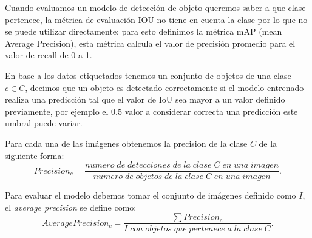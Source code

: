 Cuando evaluamos un modelo de detección de objeto queremos saber a que clase pertenece, la métrica de evaluación IOU no tiene en cuenta la clase por lo que no se puede utilizar directamente; para esto definimos la métrica mAP (mean Average Precision), esta métrica calcula el valor de precisión promedio para el valor de recall de 0 a 1.

En base a los datos etiquetados tenemos un conjunto de objetos de una clase $c \in C$, decimos que un objeto es detectado correctamente si el modelo entrenado realiza una predicción tal que el valor de IoU sea mayor a un valor definido previamente, por ejemplo el $0.5$ valor a considerar correcta una predicción este umbral puede variar.


Para cada una de las imágenes obtenemos la precision de la clase $C$ de la siguiente forma:
\begin{equation}
Precision_c = \frac{numero\;de\;detecciones\;de\;la\;clase\;C\;en\;una\;imagen}{numero\;de\;objetos\;de\;la\;clase\;C\;en\;una\;imagen}.
\end{equation}

Para evaluar el modelo debemos tomar el conjunto de imágenes definido como $I$, el \textit{average precision} se define como:
\begin{equation}
Average Precision_c = \frac{\sum Precision_c}{I\;con\;objetos\;que\;pertenece\;a\;la\;clase\;C}.
\end{equation}

